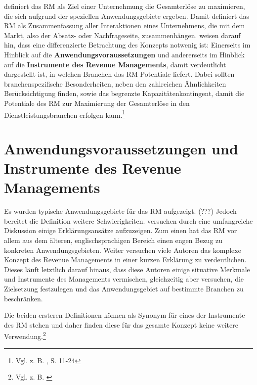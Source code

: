 \cite{Petrick:2009aa} definiert das RM als Ziel einer Unternehmung die Gesamterlöse zu maximieren, die sich aufgrund der speziellen Anwendungsgebiete ergeben. Damit definiert \cite{Petrick:2009aa} das RM als Zusammenfassung aller Interaktionen eines Unternehmens, die mit dem Markt, also der Absatz- oder Nachfrageseite, zusammenhängen. \cite{kimms2005revenue} weisen darauf hin, dass eine differenzierte Betrachtung des Konzepts notwenig ist: Einerseits im Hinblick auf die \textbf{Anwendungsvoraussetzungen} und andererseits im Hinblick auf die \textbf{Instrumente des Revenue Managements}, damit verdeutlicht dargestellt ist, in welchen Branchen das RM Potentiale liefert. Dabei sollten branchenspezifische Besonderheiten, neben den zahlreichen Ähnlichkeiten Berücksichtigung finden, sowie das begrenzte Kapazitätenkontingent, damit die Potentiale des RM zur Maximierung der Gesamterlöse in den Dienstleistungsbranchen erfolgen kann.\footnote{Vgl. z. B. \cite{Martens:2009aa}, S. 11-24}\\

\section{Anwendungsvoraussetzungen und Instrumente des Revenue Managements}

Es wurden typische Anwendungsgebiete für das RM aufgezeigt. (???) Jedoch bereitet die Definition weitere Schwierigkeiten. \cite{kimms2005revenue} versuchen durch eine umfangreiche Diskussion einige Erklärungsansätze aufzuzeigen. Zum einen hat das RM vor allem aus dem älteren, englischsprachigen Bereich einen engen Bezug zu konkreten Anwendungsgebieten. Weiter versuchen viele Autoren das komplexe Konzept des Revenue Managements in einer kurzen Erklärung zu verdeutlichen. Dieses läuft letztlich darauf hinaus, dass diese Autoren einige situative Merkmale und Instrumente des Managements vermischen, gleichzeitig aber versuchen, die Zielsetzung festzulegen und das Anwendungsgebiet auf bestimmte Branchen zu beschränken. 

  Die beiden ersteren Definitionen können als Synonym für eines der Instrumente des RM stehen und daher finden diese für das gesamte Konzept keine weitere Verwendung.\footnote{Vgl. z. B. \cite{Petrick:2009aa}}\\

